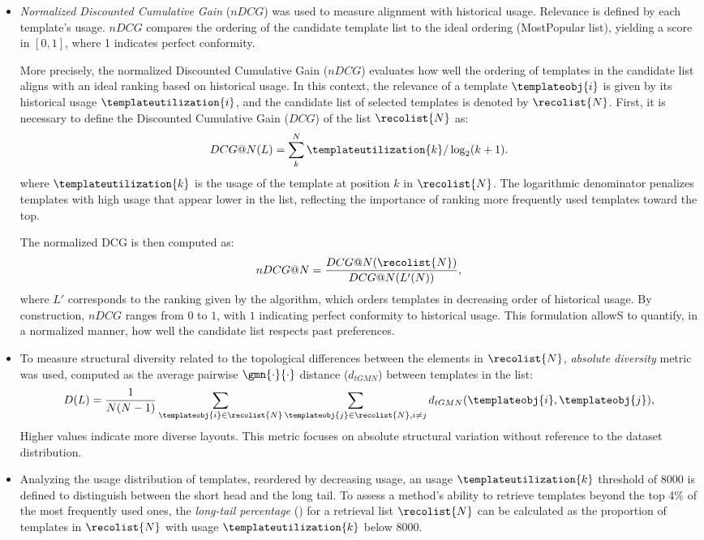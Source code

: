 \begin{itemize}
    \item[\textbf{Conformity to Historical Usage}] \emph{Normalized Discounted Cumulative Gain} ($nDCG$) was used to measure alignment with historical usage. Relevance is defined by each template's usage. $nDCG$ compares the ordering of the candidate template list to the ideal ordering (MostPopular list), yielding a score in $[0,1]$, where 1 indicates perfect conformity.

More precisely, the normalized Discounted Cumulative Gain ($nDCG$) evaluates how well the ordering of templates in the candidate list aligns with an ideal ranking based on historical usage. In this context, the relevance of a template $\templateobj{i}$ is given by its historical usage $\templateutilization{i}$, and the candidate list of selected templates is denoted by $\recolist{N}$.
First, it is necessary to define the Discounted Cumulative Gain ($DCG$) of the list $\recolist{N}$ as:
\[
    DCG@N(L) = \sum^{N}_k \templateutilization{k} / \log_2(k+1).
\]
where $\templateutilization{k}$ is the usage of the template at position $k$ in $\recolist{N}$. The logarithmic denominator penalizes templates with high usage that appear lower in the list, reflecting the importance of ranking more frequently used templates toward the top.

The normalized DCG is then computed as:
\[
    nDCG@N = \frac{DCG@N (\recolist{N})}{DCG@N (L'(N))},
\]
where $L'$ corresponds to the ranking given by the \mostpopular algorithm, which orders templates in decreasing order of historical usage. By construction, $nDCG$ ranges from $0$ to $1$, with $1$ indicating perfect conformity to historical usage. This formulation allowS to quantify, in a normalized manner, how well the candidate list respects past preferences.


\item[\textbf{Structural Diversity}] To measure structural diversity related to the topological differences between the elements in $\recolist{N}$, \emph{absolute diversity} metric~\cite{clusdiv} was used, computed as the average pairwise $\gmn{\cdot}{\cdot}$ distance ($d_{tGMN}$) between templates in the list:
\[
D(L) = \frac{1}{N(N-1)} \sum_{\templateobj{i} \in \recolist{N}} \sum_{\templateobj{j} \in \recolist{N}, i \neq j} d_{tGMN}(\templateobj{i},\templateobj{j}),
\]
Higher values indicate more diverse layouts. This metric focuses on absolute structural variation without reference to the dataset distribution.

\item[\textbf{Long-Tail Coverage}] Analyzing the usage distribution of templates, reordered by decreasing usage, an usage $\templateutilization{k}$ threshold of $8000$ is defined to distinguish between the short head and the long tail. To assess a method's ability to retrieve templates beyond the top 4\% of the most frequently used ones, the \emph{long-tail percentage} (\LTP) for a retrieval list $\recolist{N}$ can be calculated as the proportion of templates in $\recolist{N}$ with usage $\templateutilization{k}$ below $8000$.
\end{itemize}




